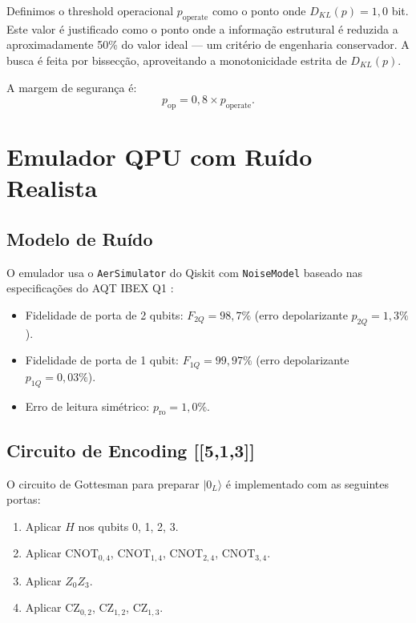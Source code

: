 \documentclass[12pt,a4paper,oneside]{book}
\theoremstyle{definition}
\theoremstyle{remark}
\begin{document}
Definimos o threshold operacional $p_{\text{operate}}$ como o ponto onde $D_{KL}(p) = 1{,}0$ bit. Este valor é justificado como o ponto onde a informação estrutural é reduzida a aproximadamente 50\% do valor ideal — um critério de engenharia conservador. A busca é feita por bissecção, aproveitando a monotonicidade estrita de $D_{KL}(p)$.

A margem de segurança é:
\begin{equation}
    p_{\text{op}} = 0{,}8 \times p_{\text{operate}}.
\end{equation}

\section{Emulador QPU com Ruído Realista}

\subsection{Modelo de Ruído}

O emulador usa o \texttt{AerSimulator} do Qiskit com \texttt{NoiseModel} baseado nas especificações do AQT IBEX Q1 \cite{aqt_ibex}:
\begin{itemize}
    \item Fidelidade de porta de 2 qubits: $F_{2Q} = 98{,}7\%$ (erro depolarizante $p_{2Q} = 1{,}3\%$).
    \item Fidelidade de porta de 1 qubit: $F_{1Q} = 99{,}97\%$ (erro depolarizante $p_{1Q} = 0{,}03\%$).
    \item Erro de leitura simétrico: $p_{\text{ro}} = 1{,}0\%$.
\end{itemize}

\subsection{Circuito de Encoding [[5,1,3]]}

O circuito de Gottesman para preparar $|0_L\rangle$ é implementado com as seguintes portas:
\begin{enumerate}
    \item Aplicar $H$ nos qubits 0, 1, 2, 3.
    \item Aplicar $\text{CNOT}_{0,4}$, $\text{CNOT}_{1,4}$, $\text{CNOT}_{2,4}$, $\text{CNOT}_{3,4}$.
    \item Aplicar $Z_0 Z_3$.
    \item Aplicar $\text{CZ}_{0,2}$, $\text{CZ}_{1,2}$, $\text{CZ}_{1,3}$.
\end{enumerate}
\end{document}
